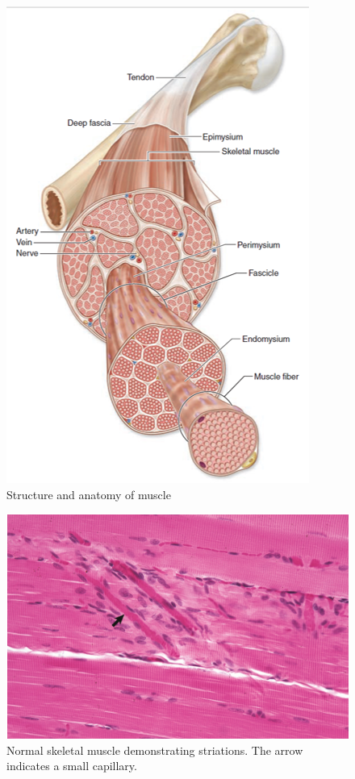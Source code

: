 \documentclass[openany]{book}
\begin{document}
\begin{figure}

{\centering \includegraphics[width=0.6\linewidth]{images/muscle_structure} 

}

\caption{Structure and anatomy of muscle}\label{fig:muscle-structure}
\end{figure}

\begin{figure}

{\centering \includegraphics[width=0.8\linewidth]{images/muscle_histo} 

}

\caption{Normal skeletal muscle demonstrating striations. The arrow indicates a small capillary.}\label{fig:muscle-histo}
\end{figure}
\end{document}
